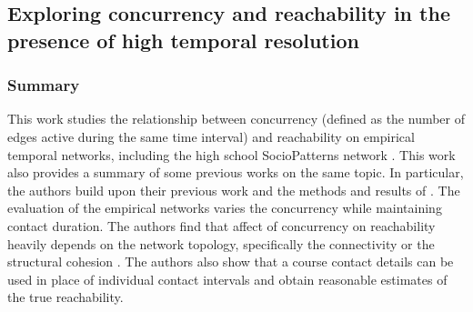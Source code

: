 \subsection{Exploring concurrency and reachability in the presence of high temporal resolution}
\subsubsection*{Summary}
This work studies the relationship between concurrency (defined as the number of edges active during the same time interval) and reachability on empirical temporal networks, including the high school SocioPatterns network \cite{Fournet2014}. This work also provides a summary of some previous works on the same topic. In particular, the authors build upon their previous work \cite{Lee2019a} and the methods and results of \cite{Moody2016}. The evaluation of the empirical networks varies the concurrency while maintaining contact duration. The authors find that affect of concurrency on reachability heavily depends on the network topology, specifically the connectivity or the structural cohesion \cite{Moody2016, Lee2019a}. The authors also show that a course contact details can be used in place of individual contact intervals and obtain reasonable estimates of the true reachability.
